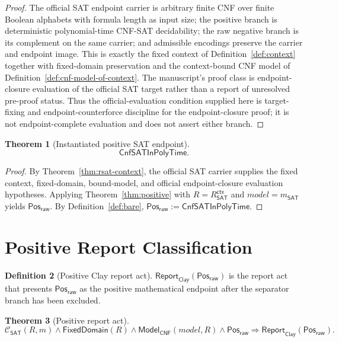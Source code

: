 \documentclass[11pt]{article}
\newtheorem{theorem}{Theorem}[section]
\theoremstyle{definition}
\newtheorem{definition}[theorem]{Definition}
\theoremstyle{remark}
\newcommand{\PosRaw}{\mathsf{Pos}_{\mathsf{raw}}}
\newcommand{\CnfSATP}{\mathsf{CnfSATInPolyTime}}
\newcommand{\ClayCtx}{\mathcal{C}_{\mathsf{SAT}}(R,m)}
\newcommand{\ReportClay}[1]{\mathsf{Report}_{\mathsf{Clay}}(#1)}
\newcommand{\RSATctx}{R_{\mathsf{SAT}}^{\mathsf{ctx}}}
\newcommand{\FixedDom}{\mathsf{FixedDomain}}
\newcommand{\ModelOfCnf}{\mathsf{Model}_{\mathsf{CNF}}}
\begin{document}
\begin{proof}
The official SAT endpoint carrier is arbitrary finite CNF over finite Boolean alphabets with formula length as input size; the positive branch is deterministic polynomial-time CNF-SAT decidability; the raw negative branch is its complement on the same carrier; and admissible encodings preserve the carrier and endpoint image. This is exactly the fixed context of Definition~\ref{def:context} together with fixed-domain preservation and the context-bound CNF model of Definition~\ref{def:cnf-model-of-context}. The manuscript's proof class is endpoint-closure evaluation of the official SAT target rather than a report of unresolved pre-proof status. Thus the official-evaluation condition supplied here is target-fixing and endpoint-counterforce discipline for the endpoint-closure proof; it is not endpoint-complete evaluation and does not assert either branch.
\end{proof}

\begin{theorem}[Instantiated positive SAT endpoint]
\label{thm:positive-instantiated}
\[
  \CnfSATP.
\]
\end{theorem}

\begin{proof}
By Theorem~\ref{thm:rsat-context}, the official SAT carrier supplies the fixed context, fixed-domain, bound-model, and official endpoint-closure evaluation hypotheses. Applying Theorem~\ref{thm:positive} with \(R=\RSATctx\) and \(model=m_{\mathsf{SAT}}\) yields \(\PosRaw\). By Definition~\ref{def:bare}, \(\PosRaw:=\CnfSATP\).
\end{proof}

\section{Positive Report Classification}\label{sec:positive-classification}

\begin{definition}[Positive Clay report act]\label{def:positive-report}
\(\ReportClay{\PosRaw}\) is the report act that presents \(\PosRaw\) as the positive mathematical endpoint after the separator branch has been excluded.
\end{definition}

\begin{theorem}[Positive report act]\label{thm:positive-report}
\[
  \ClayCtx\wedge\FixedDom(R)\wedge\ModelOfCnf(model,R)\wedge\PosRaw\Rightarrow\ReportClay{\PosRaw}.
\]
\end{theorem}
\end{document}
